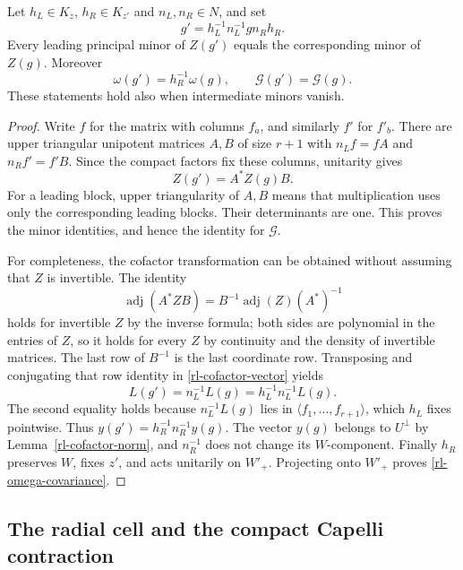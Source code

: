 \begin{lemma}\label{rl-cofactor-covariance}
Let $h_L\in K_z$, $h_R\in K_{z'}$ and
$n_L,n_R\in N$, and set
\[
                  g'=h_L^{-1}n_L^{-1}g n_Rh_R.
\]
Every leading principal minor of $Z(g')$ equals the
corresponding minor of $Z(g)$.  Moreover
\begin{equation}\label{rl-omega-covariance}
                \omega(g')=h_R^{-1}\omega(g),
       \qquad \mathcal G(g')=\mathcal G(g).
\end{equation}
These statements hold also when intermediate minors vanish.
\end{lemma}

\begin{proof}
Write $f$ for the matrix with columns $f_a$, and
similarly $f'$ for $f'_b$.  There are upper triangular
unipotent matrices $A,B$ of size $r+1$ with
$n_Lf=fA$ and $n_Rf'=f'B$.
Since the compact factors fix these columns,
unitarity gives
\[
                         Z(g')=A^*Z(g)B.
\]
For a leading block, upper triangularity of $A,B$
means that multiplication uses only the corresponding
leading blocks.  Their determinants are one.
This proves the minor identities, and hence the
identity for $\mathcal G$.

For completeness, the cofactor transformation can be
obtained without assuming that $Z$ is invertible.
The identity
\[
 \operatorname{adj}(A^* Z B)
       =B^{-1}\operatorname{adj}(Z)(A^*)^{-1}
\]
holds for invertible $Z$ by the inverse formula;
both sides are polynomial in the entries of $Z$,
so it holds for every $Z$ by continuity and the
density of invertible matrices.  The last row of
$B^{-1}$ is the last coordinate row.  Transposing
and conjugating that row identity in
\eqref{rl-cofactor-vector} yields
\[
                 L(g')=n_L^{-1}L(g)
                       =h_L^{-1}n_L^{-1}L(g).
\]
The second equality holds because
$n_L^{-1}L(g)$ lies in $\langle f_1,\ldots,f_{r+1}\rangle$,
which $h_L$ fixes pointwise.  Thus
$y(g')=h_R^{-1}n_R^{-1}y(g)$.
The vector $y(g)$ belongs to $U^\perp$ by
Lemma~\ref{rl-cofactor-norm}, and $n_R^{-1}$
does not change its $W$-component.
Finally $h_R$ preserves $W$, fixes $z'$, and
acts unitarily on $W'_+$.  Projecting onto $W'_+$
proves \eqref{rl-omega-covariance}.
\end{proof}

\subsection{The radial cell and the compact Capelli contraction}

